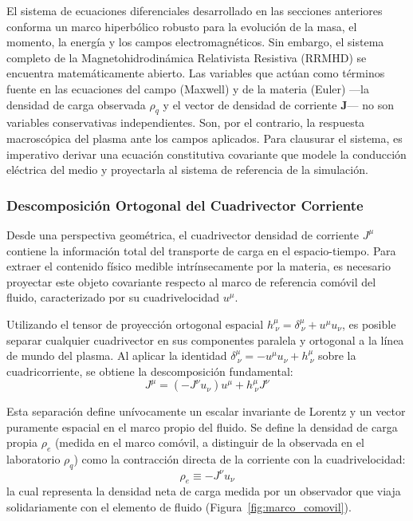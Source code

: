 \primerparrafo El sistema de ecuaciones diferenciales desarrollado en las secciones anteriores conforma un marco hiperbólico robusto para la evolución de la masa, el momento, la energía y los campos electromagnéticos. Sin embargo, el sistema completo de la Magnetohidrodinámica Relativista Resistiva (RRMHD) se encuentra matemáticamente abierto. Las variables que actúan como términos fuente en las ecuaciones del campo (Maxwell) y de la materia (Euler) —la densidad de carga observada $\rho_q$ y el vector de densidad de corriente $\mathbf{J}$— no son variables conservativas independientes. Son, por el contrario, la respuesta macroscópica del plasma ante los campos aplicados. Para clausurar el sistema, es imperativo derivar una ecuación constitutiva covariante que modele la conducción eléctrica del medio y proyectarla al sistema de referencia de la simulación.

\subsubsection{Descomposición Ortogonal del Cuadrivector Corriente}

\primerparrafo Desde una perspectiva geométrica, el cuadrivector densidad de corriente $J^\mu$ contiene la información total del transporte de carga en el espacio-tiempo. Para extraer el contenido físico medible intrínsecamente por la materia, es necesario proyectar este objeto covariante respecto al marco de referencia comóvil del fluido, caracterizado por su cuadrivelocidad $u^\mu$.

Utilizando el tensor de proyección ortogonal espacial $h^\mu_{\ \nu} = \delta^\mu_{\ \nu} + u^\mu u_\nu$, es posible separar cualquier cuadrivector en sus componentes paralela y ortogonal a la línea de mundo del plasma. Al aplicar la identidad $\delta^\mu_{\ \nu} = -u^\mu u_\nu + h^\mu_{\ \nu}$ sobre la cuadricorriente, se obtiene la descomposición fundamental:
\begin{equation}
    J^\mu = (-J^\nu u_\nu) u^\mu + h^\mu_{\ \nu} J^\nu
\end{equation}

Esta separación define unívocamente un escalar invariante de Lorentz y un vector puramente espacial en el marco propio del fluido. Se define la densidad de carga propia $\rho_e$ (medida en el marco comóvil, a distinguir de la observada en el laboratorio $\rho_q$) como la contracción directa de la corriente con la cuadrivelocidad:
\begin{equation}
    \rho_e \equiv -J^\nu u_\nu
\end{equation}
la cual representa la densidad neta de carga medida por un observador que viaja solidariamente con el elemento de fluido (Figura~\ref{fig:marco_comovil}).

